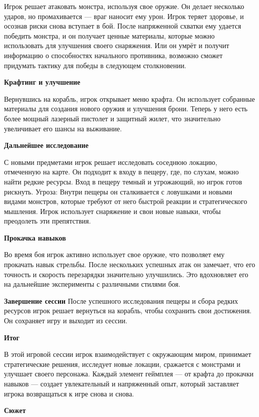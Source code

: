 \documentclass[a4paper,12pt]{article}
\begin{document}
Игрок решает атаковать монстра, используя свое оружие. Он делает несколько ударов, но промахивается — враг наносит ему урон. Игрок теряет здоровье, и осознав риски снова вступает в бой. После напряженной схватки ему удается победить монстра, и он получает ценные материалы, которые можно использовать для улучшения своего снаряжения. Или он умрёт и получит информацию о способностях начального противника, возможно сможет придумать тактику для победы в следующем столкновении.

\textbf{Крафтинг и улучшение}

Вернувшись на корабль, игрок открывает меню крафта. Он использует собранные материалы для создания нового оружия и улучшения брони. Теперь у него есть более мощный лазерный пистолет и защитный жилет, что значительно увеличивает его шансы на выживание.

\textbf{Дальнейшее исследование}

С новыми предметами игрок решает исследовать соседнюю локацию, отмеченную на карте. Он подходит к входу в пещеру, где, по слухам, можно найти редкие ресурсы. Вход в пещеру темный и угрожающий, но игрок готов рискнуть. Угроза: Внутри пещеры он сталкивается с ловушками и новыми видами монстров, которые требуют от него быстрой реакции и стратегического мышления. Игрок использует снаряжение и свои новые навыки, чтобы преодолеть эти препятствия.

\textbf{Прокачка навыков}

Во время боя игрок активно использует свое оружие, что позволяет ему прокачать навык стрельбы. После нескольких успешных атак он замечает, что его точность и скорость перезарядки значительно улучшились. Это вдохновляет его на дальнейшие эксперименты с различными стилями боя.

\textbf{Завершение сессии}
После успешного исследования пещеры и сбора редких ресурсов игрок решает вернуться на корабль, чтобы сохранить свои достижения. Он сохраняет игру и выходит из сессии.

\textbf{Итог}

В этой игровой сессии игрок взаимодействует с окружающим миром, принимает стратегические решения, исследует новые локации, сражается с монстрами и улучшает своего персонажа. Каждый элемент геймплея — от крафта до прокачки навыков — создает увлекательный и напряженный опыт, который заставляет игрока возвращаться к игре снова и снова.

\textbf{Сюжет}
\end{document}
